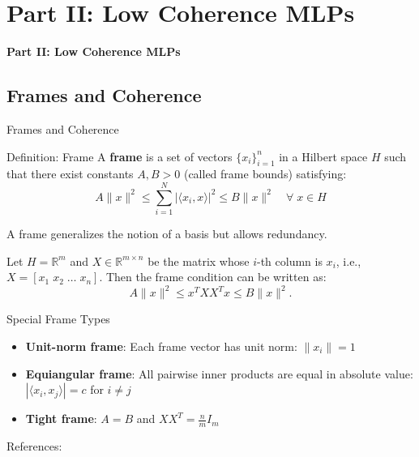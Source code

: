 \documentclass[9pt,dvipsnames]{beamer}
\begin{document}
\section{Part II: Low Coherence MLPs}
\begin{frame}

	\centering
	\Huge \textbf{Part II: Low Coherence MLPs}

\end{frame}
\subsection{Frames and Coherence}
\begin{frame}{Frames and Coherence}

	\begin{block}{Definition: Frame}
		A \textbf{frame} is a set of vectors $\{x_i\}_{i=1}^n$ in a Hilbert space $H$ such that there exist constants $A, B > 0$ (called frame bounds) satisfying:
		\begin{equation*}
			A \|x\|^2 \leq \sum_{i=1}^N |\langle x_i, x \rangle|^2 \leq B \|x\|^2 \quad \forall \; x \in H
		\end{equation*}

		A frame generalizes the notion of a basis but allows redundancy.

		Let $H = \mathbb{R}^m$ and $X \in \mathbb{R}^{m \times n}$ be the matrix whose $i$-th column is $x_i$, i.e., $X = [x_1 \; x_2 \; \dots \; x_n]$. Then the frame condition can be written as:
		\begin{equation*}
			A \|x\|^2 \leq x^T X X^T x \leq B \|x\|^2.
		\end{equation*}
	\end{block}

	\begin{block}{Special Frame Types}
		\begin{itemize}
			\item \textbf{Unit-norm frame}: Each frame vector has unit norm: $\|x_i\| = 1$
			\item \textbf{Equiangular frame}: All pairwise inner products are equal in absolute value: $|\langle x_i, x_j \rangle| = c$ for $i \neq j$
			\item \textbf{Tight frame}: $A = B$ and $XX^T = \frac{n}{m}I_m$
		\end{itemize}
	\end{block}

	References: \cite{thill_low-coherence_2015, thill_group_2015}

\end{frame}
\end{document}
